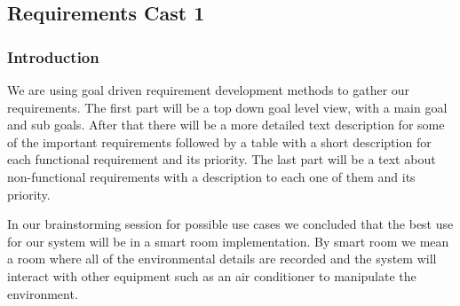 \documentclass[../document]{subfiles}
\begin{document}
\subsection{Requirements Cast 1}
\subsubsection{Introduction}
We are using goal driven requirement development methods to gather our requirements. The first part will be a top down goal level view, with a main goal and sub goals. After that there will be a more detailed text description for some of the important requirements followed by a table with a short description for each functional requirement and its priority. The last part will be a text about non-functional requirements with a description to each one of them and its priority.

In our brainstorming session for possible use cases we concluded that the best use for our system will be in a smart room implementation. By smart room we mean a room where all of the environmental details are recorded and the system will interact with other equipment such as an air conditioner to manipulate the environment.
\end{document}

